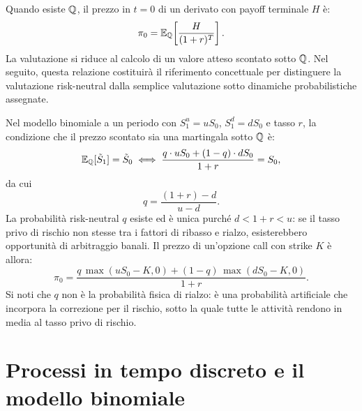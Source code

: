 Quando esiste $\mathbb{Q}$, il prezzo in $t=0$ di un derivato con
payoff terminale $H$ \`{e}:
\[
\pi_0=\mathbb{E}_{\mathbb{Q}}\!\left[\frac{H}{(1+r)^T}\right].
\]
La valutazione si riduce al calcolo di un valore atteso
scontato sotto $\mathbb{Q}$. Nel seguito, questa relazione costituir\`{a} il riferimento
concettuale per distinguere la valutazione risk-neutral dalla semplice
valutazione sotto dinamiche probabilistiche assegnate.

\begin{example}
\label{es:misura-q-binomiale}
Nel modello binomiale a un periodo con $S_1^u=uS_0$,
$S_1^d=dS_0$ e tasso $r$, la condizione che il prezzo scontato
sia una martingala sotto $\mathbb{Q}$ \`{e}:
\[
\mathbb{E}_{\mathbb{Q}}[\tilde{S}_1]=\tilde{S}_0
\;\Longleftrightarrow\;
\frac{q\cdot uS_0+(1-q)\cdot dS_0}{1+r}=S_0,
\]
da cui
\[
q=\frac{(1+r)-d}{u-d}.
\]
La probabilit\`{a} risk-neutral $q$ esiste ed \`{e} unica
purch\'{e} $d<1+r<u$: se il tasso privo di rischio non stesse
tra i fattori di ribasso e rialzo, esisterebbero opportunit\`{a}
di arbitraggio banali. Il prezzo di un'opzione call con strike
$K$ \`{e} allora:
\[
\pi_0=\frac{q\,\max(uS_0-K,0)+(1-q)\,\max(dS_0-K,0)}{1+r}.
\]
Si noti che $q$ non \`{e} la probabilit\`{a} fisica di rialzo:
\`{e} una probabilit\`{a} artificiale che incorpora la
correzione per il rischio, sotto la quale tutte le attivit\`{a}
rendono in media al tasso privo di rischio.
\end{example}

%
%

\section{Processi in tempo discreto e il modello binomiale}
\label{sec:binomiale}

